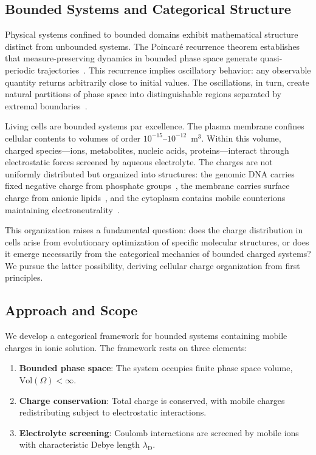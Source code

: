 \documentclass[twocolumn,aps,prb,superscriptaddress,longbibliography,floatfix]{revtex4-2}
\theoremstyle{remark}
\newcommand{\lambdaD}{\lambda_\text{D}}
\begin{document}
\subsection{Bounded Systems and Categorical Structure}

Physical systems confined to bounded domains exhibit mathematical
structure distinct from unbounded systems. The Poincar\'{e} recurrence
theorem establishes that measure-preserving dynamics in bounded phase
space generate quasi-periodic trajectories~\cite{Poincare1890}. This
recurrence implies oscillatory behavior: any observable quantity returns
arbitrarily close to initial values. The oscillations, in turn, create
natural partitions of phase space into distinguishable regions separated
by extremal boundaries~\cite{Arnold1978,Birkhoff1931}.

Living cells are bounded systems par excellence. The plasma membrane
confines cellular contents to volumes of order $10^{-15}$--$10^{-12}$~m$^3$.
Within this volume, charged species---ions, metabolites, nucleic acids,
proteins---interact through electrostatic forces screened by aqueous
electrolyte. The charges are not uniformly distributed but organized into
structures: the genomic DNA carries fixed negative charge from phosphate
groups~\cite{Manning1978}, the membrane carries surface charge from anionic
lipids~\cite{McLaughlin1989}, and the cytoplasm contains mobile
counterions maintaining electroneutrality~\cite{Alberts2015}.

This organization raises a fundamental question: does the charge
distribution in cells arise from evolutionary optimization of specific
molecular structures, or does it emerge necessarily from the categorical
mechanics of bounded charged systems? We pursue the latter possibility,
deriving cellular charge organization from first principles.

\subsection{Approach and Scope}

We develop a categorical framework for bounded systems containing mobile
charges in ionic solution. The framework rests on three elements:
\begin{enumerate}
    \item \textbf{Bounded phase space}: The system occupies finite phase
    space volume, $\text{Vol}(\Omega) < \infty$.

    \item \textbf{Charge conservation}: Total charge is conserved, with
    mobile charges redistributing subject to electrostatic interactions.

    \item \textbf{Electrolyte screening}: Coulomb interactions are screened
    by mobile ions with characteristic Debye length $\lambdaD$.
\end{enumerate}
\end{document}
